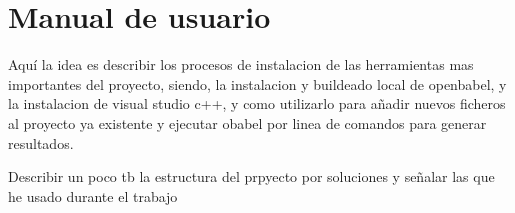 \chapter{Manual de usuario}
\label{apend:manual}

Aquí la idea es describir los procesos de instalacion de las herramientas mas importantes del proyecto, siendo, la instalacion y buildeado local de openbabel, y la instalacion de visual studio c++, y como utilizarlo para añadir nuevos ficheros al proyecto ya existente y ejecutar obabel por linea de comandos para generar resultados.

Describir un poco tb la estructura del prpyecto por soluciones y señalar las que he usado durante el trabajo